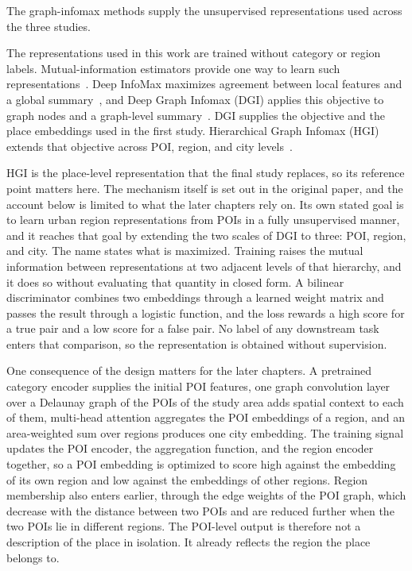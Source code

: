 The graph-infomax methods supply the unsupervised representations used across the
three studies.

The representations used in this work are trained without category or region labels.
Mutual-information estimators provide one way to learn such
representations~\cite{belghazi2018mine}. Deep InfoMax maximizes agreement between
local features and a global summary~\cite{hjelm2019dim}, and Deep Graph Infomax (DGI)
applies this objective to graph nodes and a graph-level
summary~\cite{velickovic2019deep}. DGI supplies the objective and the place embeddings
used in the first study. Hierarchical Graph Infomax (HGI) extends that objective
across POI, region, and city levels~\cite{huang2023hgi}.

HGI is the place-level representation that the final study replaces, so its reference
point matters here. The mechanism itself is set out in the original paper, and the
account below is limited to what the later chapters rely on. Its own stated goal is to
learn urban region representations from POIs in a fully unsupervised manner, and it
reaches that goal by extending the two scales of DGI to three: POI, region, and city.
The name states what is maximized. Training raises the mutual information between
representations at two adjacent levels of that hierarchy, and it does so without
evaluating that quantity in closed form. A bilinear discriminator combines two
embeddings through a learned weight matrix and passes the result through a logistic
function, and the loss rewards a high score for a true pair and a low score for a
false pair. No label of any downstream task enters that comparison, so the
representation is obtained without supervision.

One consequence of the design matters for the later chapters. A pretrained category
encoder supplies the initial POI features, one graph convolution layer over a Delaunay
graph of the POIs of the study area adds spatial context to each of them, multi-head
attention aggregates the POI embeddings of a region, and an area-weighted sum over
regions produces one city embedding. The training signal updates the POI encoder, the
aggregation function, and the region encoder together, so a POI embedding is optimized
to score high against the embedding of its own region and low against the embeddings
of other regions. Region membership also enters earlier, through the edge weights of
the POI graph, which decrease with the distance between two POIs and are reduced
further when the two POIs lie in different regions. The POI-level output is therefore
not a description of the place in isolation. It already reflects the region the place
belongs to.

